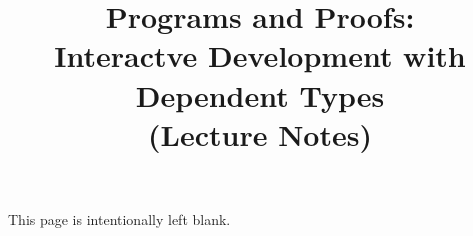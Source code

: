 \documentclass[12pt]{report}
\title{Programs and Proofs:\\
Interactve Development with Dependent Types 
\\
(Lecture Notes)
}
\author{}
\begin{document}
\maketitle

\thispagestyle{empty}
\mbox{}\vfill

\begin{center}

This page is intentionally left blank.

\end{center}


\tableofcontents



\clearpage

% 
% 

\end{document}
